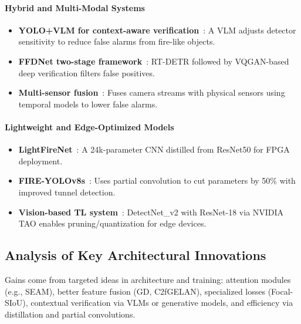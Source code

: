\documentclass[12pt,a4paper]{article}
\begin{document}
\paragraph{Hybrid and Multi-Modal Systems}
\begin{itemize}
  \item \textbf{YOLO+VLM for context-aware verification}~\cite{kim2025vlm}: A VLM adjusts detector sensitivity to reduce false alarms from fire-like objects.
  \item \textbf{FFDNet two-stage framework}~\cite{liu2025ffdnet}: RT-DETR followed by VQGAN-based deep verification filters false positives.
  \item \textbf{Multi-sensor fusion}~\cite{kim2024multisensor}: Fuses camera streams with physical sensors using temporal models to lower false alarms.
\end{itemize}

\paragraph{Lightweight and Edge-Optimized Models}
\begin{itemize}
  \item \textbf{LightFireNet}~\cite{zha2025lightfirenet}: A 24k-parameter CNN distilled from ResNet50 for FPGA deployment.
  \item \textbf{FIRE-YOLOv8s}~\cite{bu2025fireyolo}: Uses partial convolution to cut parameters by 50\% with improved tunnel detection.
  \item \textbf{Vision-based TL system}~\cite{pan2024efa}: DetectNet\_v2 with ResNet-18 via NVIDIA TAO enables pruning/quantization for edge devices.
\end{itemize}

\subsection{Analysis of Key Architectural Innovations}
Gains come from targeted ideas in architecture and training: attention modules (e.g., SEAM), better feature fusion (GD, C2fGELAN), specialized losses (Focal-SIoU), contextual verification via VLMs or generative models, and efficiency via distillation and partial convolutions.
\end{document}
